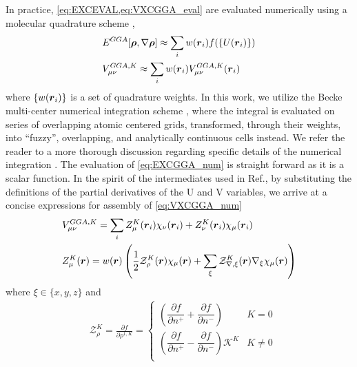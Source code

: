 In practice, \cref{eq:EXCEVAL,eq:VXCGGA_eval} are evaluated numerically using a molecular quadrature scheme
\cite{Becke88_2547,Jackson90_7453,Laming93_997,Johnson95_169,Frisch96_213,Reveles04_681,Sierka11_3097},
\begin{align}
  &E^{GGA}[\boldsymbol{\rho},\nabla\boldsymbol{\rho}] \approx \sum_i w(\boldsymbol{r}_i) f(\{U(\boldsymbol{r}_i)\}) \label{eq:EXCGGA_num}\\
  &V^{GGA,K}_{\mu\nu} \approx \sum_i w(\boldsymbol{r}_i) V^{GGA,K}_{\mu\nu}(\boldsymbol{r}_i) \label{eq:VXCGGA_num}
\end{align}
where $\{w(\boldsymbol{r}_i)\}$ is a set of quadrature weights. 
In this work, we utilize the Becke multi-center numerical integration scheme
\cite{Becke88_2547}, where the integral is evaluated on series of overlapping
atomic centered grids, transformed, through their weights, into ``fuzzy'',
overlapping, and analytically continuous cells instead.  We refer the
reader to a more thorough discussion regarding specific
details of the numerical integration \cite{Becke88_2547,Frisch96_213}.
The evaluation of \cref{eq:EXCGGA_num} is straight forward as it is a scalar function. In the spirit of the intermediates used
in Ref.\cite{Sierka11_3097}, by substituting the definitions of the partial derivatives of the U and V variables, we arrive
at a concise expressions for assembly of \cref{eq:VXCGGA_num} 
\begin{align}
&V^{GGA,K}_{\mu\nu} = \sum_i Z^K_\mu(\boldsymbol{r}_i) \chi_\nu(\boldsymbol{r}_i) + Z^K_\nu(\boldsymbol{r}_i) \chi_\mu(\boldsymbol{r}_i) \label{eq:VXC_point_update}\\
  &Z^K_\mu(\boldsymbol{r}) = w(\boldsymbol{r})
    \left(
      \frac{1}{2} \mathcal{Z}^K_{\rho}(\boldsymbol{r}) \chi_\mu(\boldsymbol{r}) + \sum_\xi \mathcal{Z}^K_{\nabla,\xi}(\boldsymbol{r}) \nabla_\xi \chi_\mu(\boldsymbol{r})
    \right) \label{eq:ZKmu}
\end{align}
where $\xi \in \{x,y,z\}$ and
\begin{subequations}
\begin{align}
&\mathcal{Z}^K_{\rho}=     \frac{\partial f}{\partial \rho^{1,K}} =
                                     \begin{cases}
  \left( \dfrac{\partial f}{\partial n^+} + \dfrac{\partial f}{\partial n^-} \right) & K = 0 \\[12pt]
  \left( \dfrac{\partial f}{\partial n^+} - \dfrac{\partial f}{\partial n^-} \right) \mathscr K^{K} & K \neq 0 \\
                                     \end{cases}
\end{align}
\label{eq:ZrhoVar}
\end{subequations}

